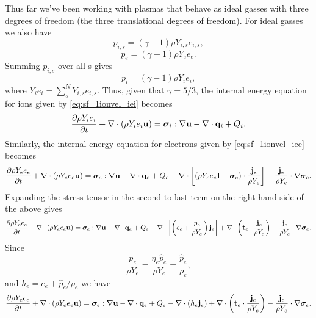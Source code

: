 \documentclass[a4paper,11pt]{report}
\begin{document}
Thus far we've been working with plasmas that behave as ideal gasses with three degrees of freedom (the three translational degrees of freedom). For ideal gasses we also have 
\begin{equation*}
    p_{i,s} = (\gamma - 1) \rho Y_{i,s} e_{i,s},
\end{equation*}
\begin{equation*}
    p_e = (\gamma - 1) \rho Y_e e_e.
\end{equation*}
Summing $p_{i,s}$ over all s gives
\begin{equation}
    p_i = (\gamma - 1) \rho Y_i e_i,
\end{equation}
where $Y_i e_i = \sum_s^N Y_{i,s} e_{i,s}$. Thus, given that $\gamma = 5/3$, the internal energy equation for ions given by \cref{eq:sf_1ionvel_iei} becomes
\begin{equation*}
    \frac{\partial \rho Y_i e_i}{\partial t} + \nabla \cdot \left( \rho Y_i e_i \mathbf{u} \right) = \bm \sigma_i : \nabla \mathbf{u} - \nabla \cdot \mathbf{q}_i + Q_i.
\end{equation*}
Similarly, the internal energy equation for electrons given by \cref{eq:sf_1ionvel_iee} becomes
\begin{equation*}
    \frac{\partial \rho Y_e e_e}{\partial t} + \nabla \cdot \left( \rho Y_e e_e \mathbf{u} \right) = \bm \sigma_e : \nabla \mathbf{u} - \nabla \cdot \mathbf{q}_e + Q_e - \nabla \cdot \left[ \left( \rho Y_e e_e \mathbf{I} - \bm \sigma_e \right) \cdot \frac{\mathbf{j}_e}{\rho Y_e}  \right] - \frac{\mathbf{j}_e}{\rho Y_e} \cdot \nabla \bm \sigma_e.
\end{equation*}
Expanding the stress tensor in the second-to-last term on the right-hand-side of the above gives
\begin{equation*}
    \frac{\partial \rho Y_e e_e}{\partial t} + \nabla \cdot \left( \rho Y_e e_e \mathbf{u} \right) = \bm \sigma_e : \nabla \mathbf{u} - \nabla \cdot \mathbf{q}_e + Q_e -\nabla \cdot \left[ \left( e_e + \frac{p_e}{\rho Y_e} \right) \mathbf{j}_e \right] + \nabla \cdot \left( \mathbf{t}_e \cdot \frac{\mathbf{j}_e}{\rho Y_e}  \right) - \frac{\mathbf{j}_e}{\rho Y_e} \cdot \nabla \bm \sigma_e.
\end{equation*}
Since
\begin{equation*}
    \frac{p_e}{\rho Y_e} = \frac{\eta_e \hat{p}_e}{\rho Y_e} = \frac{\hat{p}_e}{\rho_e},
\end{equation*}
and $h_e = e_e + \hat{p}_e / \rho_e$ we have 
\begin{equation*}
    \frac{\partial \rho Y_e e_e}{\partial t} + \nabla \cdot \left( \rho Y_e e_e \mathbf{u} \right) = \bm \sigma_e : \nabla \mathbf{u} - \nabla \cdot \mathbf{q}_e + Q_e -\nabla \cdot \left( h_e \mathbf{j}_e \right) + \nabla \cdot \left( \mathbf{t}_e \cdot \frac{\mathbf{j}_e}{\rho Y_e}  \right) - \frac{\mathbf{j}_e}{\rho Y_e} \cdot \nabla \bm \sigma_e.
\end{equation*}
\end{document}
